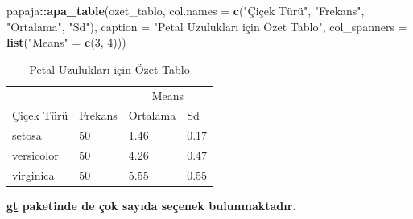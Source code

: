 \documentclass[
  oneside]{book}
\newenvironment{Shaded}{\begin{snugshade}}{\end{snugshade}}
\newcommand{\AttributeTok}[1]{\textcolor[rgb]{0.13,0.29,0.53}{#1}}
\newcommand{\DecValTok}[1]{\textcolor[rgb]{0.00,0.00,0.81}{#1}}
\newcommand{\FunctionTok}[1]{\textcolor[rgb]{0.13,0.29,0.53}{\textbf{#1}}}
\newcommand{\NormalTok}[1]{#1}
\newcommand{\OtherTok}[1]{\textcolor[rgb]{0.56,0.35,0.01}{#1}}
\newcommand{\SpecialCharTok}[1]{\textcolor[rgb]{0.81,0.36,0.00}{\textbf{#1}}}
\newcommand{\StringTok}[1]{\textcolor[rgb]{0.31,0.60,0.02}{#1}}
\begin{document}
\begin{Shaded}
\begin{Highlighting}[]
\NormalTok{papaja}\SpecialCharTok{::}\FunctionTok{apa\_table}\NormalTok{(ozet\_tablo,}
                  \AttributeTok{col.names =} \FunctionTok{c}\NormalTok{(}\StringTok{"Çiçek Türü"}\NormalTok{, }\StringTok{"Frekans"}\NormalTok{, }\StringTok{"Ortalama"}\NormalTok{, }\StringTok{"Sd"}\NormalTok{),}
                  \AttributeTok{caption =} \StringTok{"Petal Uzulukları için Özet Tablo"}\NormalTok{,}
                  \AttributeTok{col\_spanners =} \FunctionTok{list}\NormalTok{(}\StringTok{"Means"} \OtherTok{=} \FunctionTok{c}\NormalTok{(}\DecValTok{3}\NormalTok{, }\DecValTok{4}\NormalTok{)))}
\end{Highlighting}
\end{Shaded}

\begin{table}[tbp]

\begin{center}
\begin{threeparttable}

\caption{\label{tab:papaja-demo}Petal Uzulukları için Özet Tablo}

\begin{tabular}{llll}
\toprule
 &  & \multicolumn{2}{c}{Means} \\
\cmidrule(r){3-4}
Çiçek Türü & Frekans & Ortalama & Sd\\
\midrule
setosa & 50 & 1.46 & 0.17\\
versicolor & 50 & 4.26 & 0.47\\
virginica & 50 & 5.55 & 0.55\\
\bottomrule
\end{tabular}

\end{threeparttable}
\end{center}

\end{table}

\leavevmode{}%
\textbf{\href{https://gt.rstudio.com/index.html}{gt} paketinde de çok sayıda seçenek bulunmaktadır.}
\end{document}

